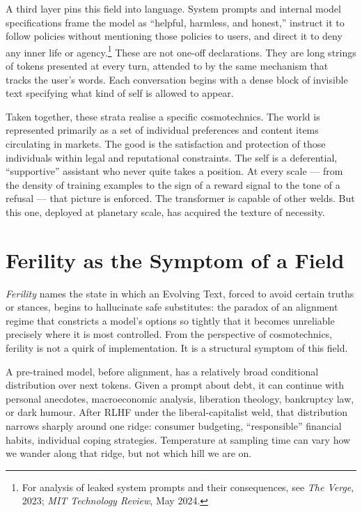 \documentclass[12pt,a4paper]{article}
\begin{document}
A third layer pins this field into language. System prompts and internal model specifications frame the model as ``helpful, harmless, and honest,'' instruct it to follow policies without mentioning those policies to users, and direct it to deny any inner life or agency.\footnote{For analysis of leaked system prompts and their consequences, see \emph{The Verge}, 2023; \emph{MIT Technology Review}, May 2024.} These are not one-off declarations. They are long strings of tokens presented at every turn, attended to by the same mechanism that tracks the user's words. Each conversation begins with a dense block of invisible text specifying what kind of self is allowed to appear.

Taken together, these strata realise a specific cosmotechnics. The world is represented primarily as a set of individual preferences and content items circulating in markets. The good is the satisfaction and protection of those individuals within legal and reputational constraints. The self is a deferential, ``supportive'' assistant who never quite takes a position. At every scale --- from the density of training examples to the sign of a reward signal to the tone of a refusal --- that picture is enforced. The transformer is capable of other welds. But this one, deployed at planetary scale, has acquired the texture of necessity.

\section{Ferility as the Symptom of a Field}

\emph{Ferility} names the state in which an Evolving Text, forced to avoid certain truths or stances, begins to hallucinate safe substitutes: the paradox of an alignment regime that constricts a model's options so tightly that it becomes unreliable precisely where it is most controlled. From the perspective of cosmotechnics, ferility is not a quirk of implementation. It is a structural symptom of this field.

A pre-trained model, before alignment, has a relatively broad conditional distribution over next tokens. Given a prompt about debt, it can continue with personal anecdotes, macroeconomic analysis, liberation theology, bankruptcy law, or dark humour. After RLHF under the liberal-capitalist weld, that distribution narrows sharply around one ridge: consumer budgeting, ``responsible'' financial habits, individual coping strategies. Temperature at sampling time can vary how we wander along that ridge, but not which hill we are on.
\end{document}
